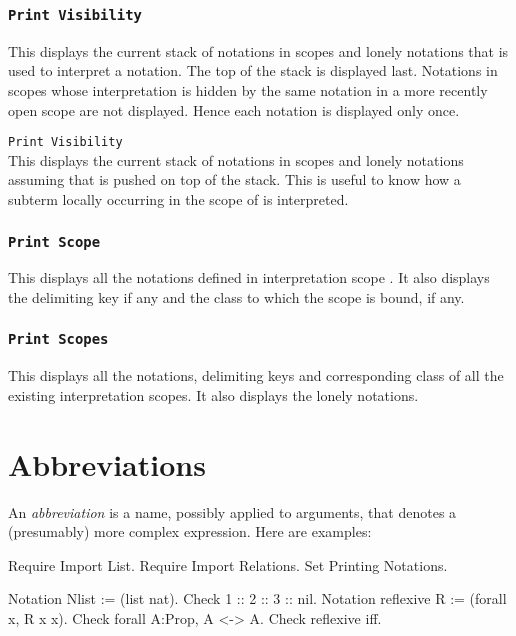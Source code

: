 \subsubsection{\tt Print Visibility}

This displays the current stack of notations in scopes and lonely
notations that is used to interpret a notation. The top of the stack
is displayed last. Notations in scopes whose interpretation is hidden
by the same notation in a more recently open scope are not
displayed. Hence each notation is displayed only once.

\variant

{\tt Print Visibility {\scope}}\\

This displays the current stack of notations in scopes and lonely
notations assuming that {\scope} is pushed on top of the stack.  This
is useful to know how a subterm locally occurring in the scope of
{\scope} is interpreted.

\subsubsection{\tt Print Scope {\scope}}

This displays all the notations defined in interpretation scope
{\scope}.  It also displays the delimiting key if any and the class to
which the scope is bound, if any.

\subsubsection{\tt Print Scopes}

This displays all the notations, delimiting keys and corresponding
class of all the existing interpretation scopes.
It also displays the lonely notations.

\section[Abbreviations]{Abbreviations
\label{Abbreviations}
}

An {\em abbreviation} is a name, possibly applied to arguments, that
denotes a (presumably) more complex expression. Here are examples:

\begin{coq_eval}
Require Import List.
Require Import Relations.
Set Printing Notations.
\end{coq_eval}
\begin{coq_example}
Notation Nlist := (list nat).
Check 1 :: 2 :: 3 :: nil.
Notation reflexive R := (forall x, R x x).
Check forall A:Prop, A <-> A.
Check reflexive iff.
\end{coq_example}

